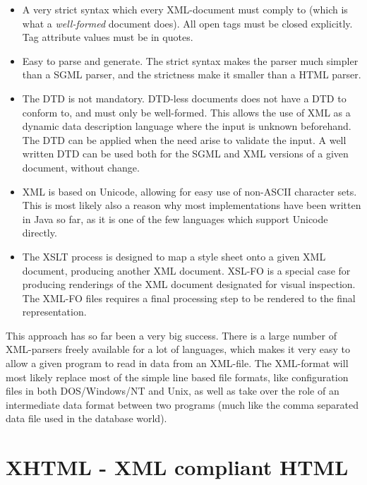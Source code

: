 \begin{itemize}

\item A very strict syntax which every XML-document must comply to
(which is what a \emph{well-formed} document does).  All open tags
must be closed explicitly.  Tag attribute values must be in quotes.
  
\item Easy to parse and generate.  The strict syntax makes the parser
much simpler than a SGML parser, and the strictness make it smaller
than a HTML parser.

\item The DTD is not mandatory.  DTD-less documents does not have a
  DTD to conform to, and must only be well-formed.  This allows the
  use of XML as a dynamic data description language where the input is
  unknown beforehand.  The DTD can be applied when the need arise to
  validate the input.  A well written DTD can be used both for the
  SGML and XML versions of a given document, without change.

\item
  XML is based on Unicode, allowing for easy use of non-ASCII
  character sets.  This is most likely also a reason why most
  implementations have been written in Java so far, as it is one of
  the few languages which support Unicode directly.
  
\item The XSLT process is designed to map a style sheet onto a given
  XML document, producing another XML document.  XSL-FO is a special
  case for producing renderings of the XML document designated for
  visual inspection.  The XML-FO files requires a final processing
  step to be rendered to the final representation.
\end{itemize}

This approach has so far been a very big success.  There is a large
number of XML-parsers freely available for a lot of languages, which
makes it very easy to allow a given program to read in data from an
XML-file.   The XML-format will most likely replace most of the simple
line based file formats, like configuration files in both
DOS/Windows/NT and Unix, as well as take over the role of an
intermediate data format between two programs (much like the comma
separated data file used in the database world).

\section{XHTML - XML compliant HTML}

